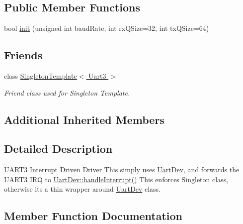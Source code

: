 \subsection*{Public Member Functions}
\begin{DoxyCompactItemize}
\item 
bool \hyperlink{classUart3_a16eb5692f595adc1385002371b33bf69}{init} (unsigned int baud\+Rate, int rx\+Q\+Size=32, int tx\+Q\+Size=64)
\end{DoxyCompactItemize}
\subsection*{Friends}
\begin{DoxyCompactItemize}
\item 
class \hyperlink{classUart3_a7e5897346270ea74cbdbe30de77954ca}{Singleton\+Template$<$ Uart3 $>$}
\begin{DoxyCompactList}\small\item\em Friend class used for Singleton Template. \end{DoxyCompactList}\end{DoxyCompactItemize}
\subsection*{Additional Inherited Members}


\subsection{Detailed Description}
U\+A\+R\+T3 Interrupt Driven Driver This simply uses \hyperlink{classUartDev}{Uart\+Dev}, and forwards the U\+A\+R\+T3 I\+RQ to \hyperlink{classUartDev_a88db44755fb545c2553cabf95a338db4}{Uart\+Dev\+::handle\+Interrupt()} This enforces Singleton class, otherwise it\textquotesingle{}s a thin wrapper around \hyperlink{classUartDev}{Uart\+Dev} class. 

\subsection{Member Function Documentation}
